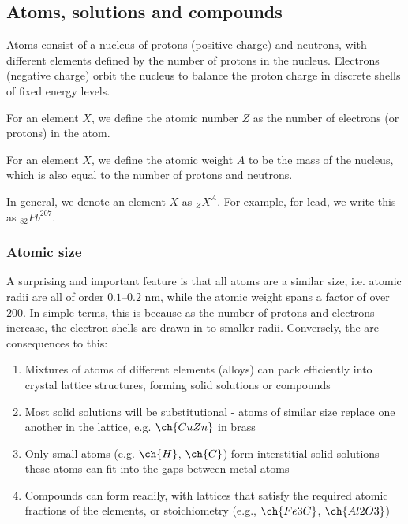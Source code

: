 \documentclass{article}
\begin{document}
\subsection{Atoms, solutions and compounds}

Atoms consist of a nucleus of protons (positive charge) and neutrons, with different elements defined by the number of protons in the nucleus. Electrons (negative charge) orbit the nucleus to balance the proton charge in discrete shells of fixed energy levels. 

\begin{definition}
    For an element $X$, we define the atomic number $Z$ as the number of electrons (or protons) in the atom.
\end{definition}

\begin{definition}
    For an element $X$, we define the atomic weight $A$ to be the mass of the nucleus, which is also equal to the number of protons and neutrons.
\end{definition}

In general, we denote an element $X$ as ${}_Z X^A$. For example, for lead, we write this as ${}_{82} Pb^{207}$.

\subsubsection{Atomic size}

A surprising and important feature is that all atoms are a similar size, i.e. atomic radii are all of order
$0.1–0.2$ nm, while the atomic weight spans a factor of over $200$. In simple terms, this is because as the
number of protons and electrons increase, the electron shells are drawn in to smaller radii. Conversely, the are consequences to this:

\begin{enumerate}
    \item Mixtures of atoms of different elements (alloys) can pack efficiently into crystal lattice structures, forming solid solutions or compounds
    \item Most solid solutions will be substitutional - atoms of similar size replace one another in the lattice, e.g. $\ch{CuZn}$ in brass
    \item Only small atoms (e.g. $\ch{H}$, $\ch{C}$) form interstitial solid solutions - these atoms can fit into the gaps between metal atoms
    \item Compounds can form readily, with lattices that satisfy the required atomic fractions of the elements, or stoichiometry (e.g., $\ch{Fe3C}$, $\ch{Al2O3}$)
\end{enumerate}
\end{document}
